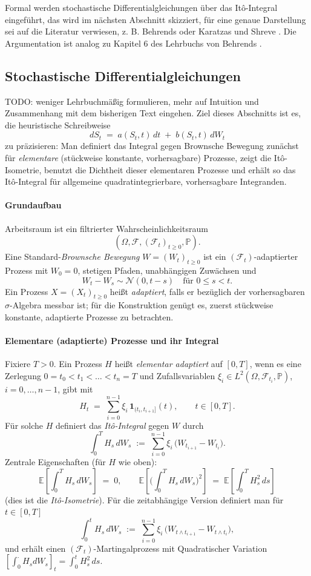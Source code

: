 Formal werden stochastische Differentialgleichungen über das It\^o-Integral eingeführt, das wird 
im nächsten Abschnitt skizziert, für eine genaue Darstellung sei auf die Literatur verwiesen, z. B. Behrends \cite{behrends} oder Karatzas und Shreve \cite{karatzas_brownian_1991}.
Die Argumentation ist analog zu Kapitel 6 des Lehrbuchs von Behrends \cite{behrends}.

\subsection{Stochastische Differentialgleichungen}
TODO: weniger Lehrbuchmäßig formulieren, mehr auf Intuition und Zusammenhang mit dem bisherigen Text eingehen.
Ziel dieses Abschnitts ist es, die heuristische Schreibweise
$$
dS_t \;=\; a(S_t,t)\,dt \;+\; b(S_t,t)\,dW_t
$$
zu präzisieren: Man definiert das Integral gegen Brownsche Bewegung zunächst für \emph{elementare} (stückweise konstante, vorhersagbare) Prozesse, zeigt die It\^o-Isometrie, benutzt die Dichtheit dieser elementaren Prozesse und erhält so das It\^o-Integral für allgemeine quadratintegrierbare, vorhersagbare Integranden.

\paragraph{Grundaufbau}
Arbeitsraum ist ein filtrierter Wahrscheinlichkeitsraum
$$
(\Omega,\mathcal F,(\mathcal F_t)_{t\ge 0},\mathbb P).
$$
Eine Standard-\emph{Brownsche Bewegung} $W=(W_t)_{t\ge 0}$ ist ein $(\mathcal F_t)$-adaptierter Prozess mit $W_0=0$, stetigen Pfaden, unabhängigen Zuwächsen und
$$
W_t - W_s \sim \mathcal N(0,t-s)\quad\text{für }0\le s<t.
$$
Ein Prozess $X=(X_t)_{t\ge 0}$ heißt \emph{adaptiert}, falls er bezüglich der vorhersagbaren $\sigma$-Algebra messbar ist; für die Konstruktion genügt es, zuerst stückweise konstante, adaptierte Prozesse zu betrachten.

\paragraph{Elementare (adaptierte) Prozesse und ihr Integral}
Fixiere $T>0$. Ein Prozess $H$ heißt \emph{elementar adaptiert} auf $[0,T]$, wenn es eine Zerlegung $0=t_0<t_1<\dots<t_n=T$ und Zufallsvariablen $\xi_i\in L^2(\Omega,\mathcal F_{t_i},\mathbb P)$, $i=0,\dots,n-1$, gibt mit
$$
H_t \;=\; \sum_{i=0}^{n-1} \xi_i\,\mathbf 1_{(t_i,t_{i+1}]}(t),\qquad t\in[0,T].
$$
Für solche $H$ definiert das \emph{It\^o-Integral} gegen $W$ durch
$$
\int_0^T H_s\,dW_s \;:=\; \sum_{i=0}^{n-1} \xi_i\,\big(W_{t_{i+1}}-W_{t_i}\big).
$$
Zentrale Eigenschaften (für $H$ wie oben):
$$
\mathbb E\!\left[\int_0^T H_s\,dW_s\right] \;=\; 0,\qquad
\mathbb E\!\left[\Big(\int_0^T H_s\,dW_s\Big)^{\!2}\right] \;=\; \mathbb E\!\left[\int_0^T H_s^2\,ds\right]
$$
(dies ist die \emph{It\^o-Isometrie}). Für die zeitabhängige Version definiert man für $t\in[0,T]$
$$
\int_0^t H_s\,dW_s \;:=\; \sum_{i=0}^{n-1} \xi_i\,\big(W_{t\wedge t_{i+1}}-W_{t\wedge t_i}\big),
$$
und erhält einen $(\mathcal F_t)$-Martingalprozess mit Quadratischer Variation
$[\!\int_0^\cdot H_s dW_s]_t = \int_0^t H_s^2\,ds$.


